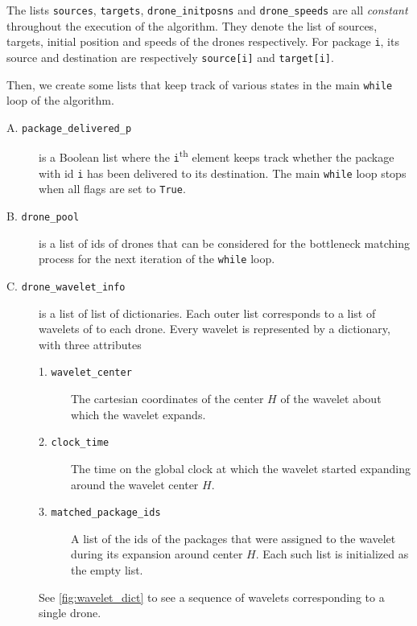 \documentclass[10pt, english, oneside]{report}
\begin{document}
The lists \verb|sources|, \verb|targets|, \verb|drone_initposns| and \verb|drone_speeds| 
are all \textit{constant} throughout the execution of the algorithm. They denote the list of sources, 
targets, initial position and speeds of the drones respectively. For package \verb|i|, its source and 
destination are respectively \verb|source[i]| and \verb|target[i]|. 


Then, we create some lists that keep track of various states in the 
main \texttt{while} loop of the algorithm. 

\begin{description}
\item[A. \texttt{package\_delivered\_p}] is a Boolean list
       where the \verb|i|\textsuperscript{th} element keeps track whether 
       the package with id \verb|i| has been delivered to its destination. 
       The main \verb|while| loop stops when all flags are set to \verb|True|. 
     
\item[B. \texttt{drone\_pool}] is a list of ids of drones that can be 
     considered for the bottleneck matching process for the next iteration of 
     the \verb|while| loop.  

\item[C. \texttt{drone\_wavelet\_info}] is a list of list of dictionaries. Each outer list 
     corresponds to a list of wavelets of to each drone. Every wavelet is represented
     by a dictionary, with three attributes
     
\begin{description}
  \item[1. \texttt{wavelet\_center}] The cartesian coordinates of the center $H$ of the 
          wavelet about which the wavelet expands.
  \item[2. \texttt{clock\_time}] The time on the global clock at which the wavelet started expanding around the 
         wavelet center $H$.
  \item[3. \texttt{matched\_package\_ids}] A list of the ids of the packages that were assigned to the wavelet 
     during its expansion around center $H$. Each such list is initialized as the empty list. 
\end{description}
     
     See \autoref{fig:wavelet_dict} to see a sequence of wavelets corresponding 
     to a single drone.   


\end{description}
\end{document}
